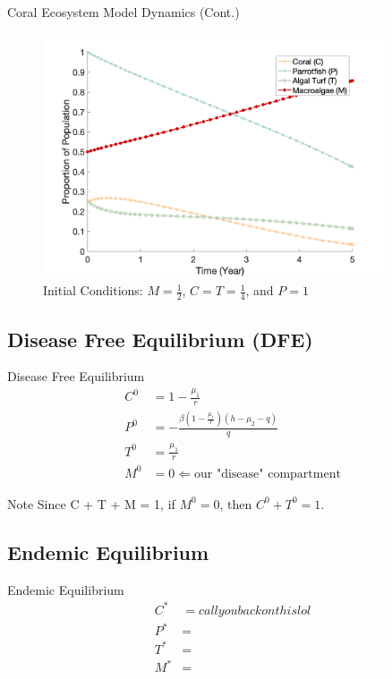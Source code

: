 \documentclass{beamer}
\begin{document}
\begin{frame}{Coral Ecosystem Model Dynamics (Cont.)}
    \begin{figure}
        \centering
        \includegraphics[width=0.9\textwidth]{Latex/Figures/0.25C_0.25T_0.5M.png}
        \caption{Initial Conditions: $M = \frac{1}{2}$, $C = T = \frac{1}{4}$, and $P = 1$}
        \label{fig:macroalgae_dominant}
    \end{figure}
\end{frame}

\subsection{Disease Free Equilibrium (DFE)}
\begin{frame}{Disease Free Equilibrium}
    \begin{align*}
        C^{0} &= 1 - \frac{\mu_{1}}{r}\\
        P^{0} &= -\frac{\beta(1 - \frac{\mu_{1}}{r})(h - \mu_{2} - q)}{q}\\
        T^{0} &= \frac{\mu_{1}}{r}\\
        M^{0} &= 0 \Longleftarrow \text{our "disease" compartment}
    \end{align*}
    \begin{block}{Note}
    Since C + T + M = 1, if $M^{0} = 0$, then $C^{0} + T^{0} = 1$.
    \end{block}
\end{frame}

\subsection{Endemic Equilibrium}
\begin{frame}{Endemic Equilibrium}
    \begin{align*}
        C^{*} &= call you back on this lol\\
        P^{*} &= \\
        T^{*} &= \\
        M^{*} &= 
    \end{align*}
\end{frame}
\end{document}
